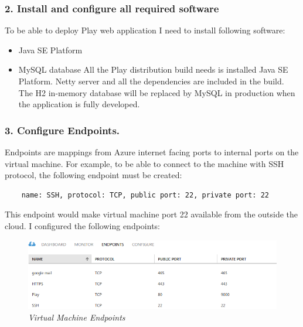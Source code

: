 \documentclass[12pt,twoside,a4paper]{report}
\begin{document}
\subsubsection{2. Install and configure all required software}
To be able to deploy Play web application I need to install following software:
\begin{itemize}\itemsep1pt \parskip0pt 
\item Java SE Platform
\item MySQL database
All the Play distribution build needs is installed Java SE Platform. Netty server and all the dependencies are included in the build. The H2 in-memory database will be replaced by MySQL in production when the application is fully developed.
\end{itemize}

\subsubsection{3. Configure Endpoints.}
Endpoints are mappings from Azure internet facing ports to internal ports on the virtual machine. For example, to be able to connect to the machine with SSH protocol, the following endpoint must be created:
\begin{lstlisting} 
	name: SSH, protocol: TCP, public port: 22, private port: 22
\end{lstlisting}
This endpoint would make virtual machine port 22 available from the outside the cloud. I configured the following endpoints:

\begin{figure}[!ht]
	\centering
		\includegraphics[width=1\textwidth, totalheight=4cm]
		{endpoints}
	\caption{\textit{Virtual Machine Endpoints}}
	\label{f4.5.1}
\end{figure}
\end{document}
